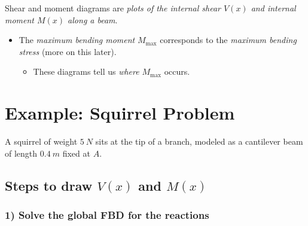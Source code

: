 \documentclass[11pt]{article}
\begin{document}

\noindent
Shear and moment diagrams are \emph{plots of the internal shear $V(x)$ and
internal moment $M(x)$ along a beam}.
\begin{itemize}[label=$\rightarrow$]
  \item The \emph{maximum bending moment} $M_{\max}$ corresponds to the
        \emph{maximum bending stress} (more on this later).
  \begin{itemize}[label=\then]
    \item These diagrams tell us \emph{where} $M_{\max}$ occurs.
  \end{itemize}
\end{itemize}

\section*{Example: Squirrel Problem}

A squirrel of weight $\SI{5}{N}$ sits at the tip of a branch, modeled as a
cantilever beam of length $\SI{0.4}{m}$ fixed at $A$.

\begin{center}
\end{center}

\subsection*{Steps to draw $V(x)$ and $M(x)$}

\subsubsection*{1) Solve the global FBD for the reactions}
\end{document}
